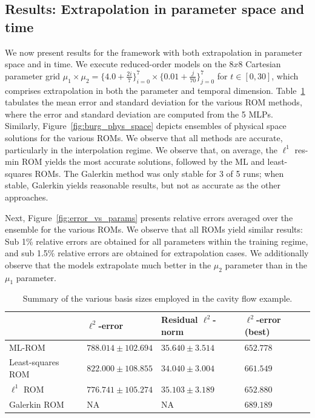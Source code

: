 \documentclass[3p,computermodern,10pt]{elsarticle}
\begin{document}
\subsection{Results: Extrapolation in parameter space and time}
We now present results for the framework with both extrapolation in parameter space and in time. We execute reduced-order models on the $8x8$ Cartesian parameter grid  $\mu_1 \times \mu_2 = \{ 4. 0+  \frac{2i}{7} \}_{i=0}^7 \times \{ 0.01 + \frac{j}{70} \}_{j=0}^7$ for $t \in [0,30]$, which comprises extrapolation in both the parameter and temporal dimension. Table~\ref{tab:burg_results} tabulates the mean error and standard deviation for the various ROM methods, where the error and standard deviation are computed from the 5 MLPs. Similarly, Figure~\ref{fig:burg_phys_space} depicts ensembles of physical space solutions for the various ROMs. We observe that all methods are accurate, particularly in the interpolation regime. We observe that, on average, the $\ell^1$ res-min ROM yields the most accurate solutions, followed by the ML and least-squares ROMs. The Galerkin method was only stable for 3 of 5 runs; when stable, Galerkin yields reasonable results, but not as accurate as the other approaches.

Next, Figure~\ref{fig:error_vs_params} presents relative errors averaged over the ensemble for the various ROMs. We observe that all ROMs yield similar results: Sub 1\% relative errors are obtained for all parameters within the training regime, and sub 1.5\% relative errors are obtained for extrapolation cases. We additionally observe that the models extrapolate much better in the $\mu_2$ parameter than in the $\mu_1$ parameter. 
\begin{table}[]
\begin{centering}
\begin{tabular}{l l l l}
\hline
  & $\ell^2$-error  & Residual $\ell^2$-norm & $\ell^2$-error (best) \\
\hline
ML-ROM    & $788.014 \pm 102.694 $ & $35.640 \pm 3.514$  &  $652.778 $ \\
Least-squares ROM & $822.000 \pm 108.855$ & $34.040 \pm 3.004$ & $661.549$\\
$\ell^1$ ROM    & $776.741 \pm 105.274$ &  $35.103 \pm  3.189$ & $652.880$\\
Galerkin ROM    & NA &  NA & $689.189$  \\
\hline
\end{tabular}
\caption{Summary of the various basis sizes employed in the cavity flow example.}
\label{tab:burg_results}
\end{centering}
\end{table}
\end{document}
